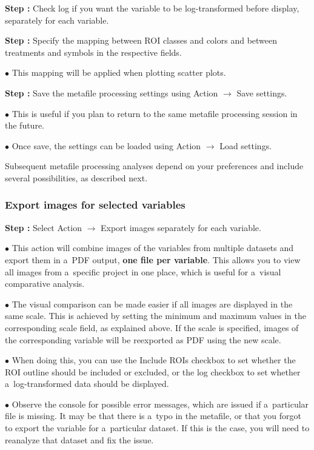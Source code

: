 \documentclass[a4paper, 11pt]{article}
\newcommand{\lans}[1]{{\color{magenta}#1}}
\newcommand{\lanscb}[1]{{\color{darkgreen}#1}}
\newcommand{\lanstf}[1]{{\color{cyan}#1}}
\newcommand\ra{\rightarrow}
\newcounter{step}
\newcommand\s{\addtocounter{step}{1}\noindent\textbf{Step \thestep:}{ }}
\newcommand\bul{\noindent$\bullet${ }}
\newcommand\bb[1]{\textbf{#1}}
\begin{document}
\s Check \lanscb{log} if you want the variable to be log-transformed before display, separately for each variable.

\s Specify the mapping between ROI classes and \lanstf{colors} and between treatments and \lanstf{symbols} in the respective fields. 

\bul This mapping will be applied when plotting scatter plots.

\s Save the metafile processing settings using \lans{Action} $\ra$ \lans{Save settings}.

\bul This is useful if you plan to return to the same metafile processing session in the future.

\bul Once save, the settings can be loaded using \lans{Action} $\ra$ \lans{Load settings}.

Subsequent metafile processing analyses depend on your preferences and include several possibilities, as described next. 

\subsubsection{Export images for selected variables}
\setcounter{step}{0}

\s Select \lans{Action} $\ra$ \lans{Export images separately for each variable}. 

\bul This action will combine images of the variables from multiple datasets and export them in a~PDF output, \bb{one file per variable}. This allows you to view all images from a~specific project in one place, which is useful for a~visual comparative analysis.

\bul The visual comparison can be made easier if all images are displayed in the same scale. This is achieved by setting the minimum and maximum values in the corresponding \lanstf{scale} field, as explained above. If the scale is specified, images of the corresponding variable will be reexported as PDF using the new scale. 

\bul When doing this, you can use the \lanscb{Include ROIs} checkbox to set whether the ROI outline should be included or excluded, or the \lanscb{log} checkbox to set whether a~log-transformed data should be displayed.

\bul Observe the console for possible error messages, which are issued if a~particular file is missing. It may be that there is a~typo in the metafile, or that you forgot to export the variable for a~particular dataset. If this is the case, you will need to reanalyze that dataset and fix the issue.
\end{document}

